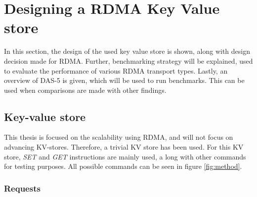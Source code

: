 
\chapter{Designing a RDMA Key Value store}\label{ch:design} %



\ifpdf
    \graphicspath{{7/figures/PNG/}{7/figures/PDF/}{7/figures/}}
\else
    \graphicspath{{7/figures/EPS/}{7/figures/}}
\fi


In this section, the design of the used key value store is shown, along with design decision made for RDMA.
Further, benchmarking strategy will be explained, used to evaluate the performance of various RDMA transport types.
Lastly, an overview of DAS-5 is given, which will be used to run benchmarks.
This can be used when comparisons are made with other findings.

\section{Key-value store}
This thesis is focused on the scalability using RDMA, and will not focus on advancing KV-stores.
Therefore, a trivial KV store has been used.
For this KV store, \textit{SET} and \textit{GET} instructions are mainly used, a long with other commands for testing purposes.
All possible commands can be seen in figure \ref{fig:method}.

\subsection{Requests}

